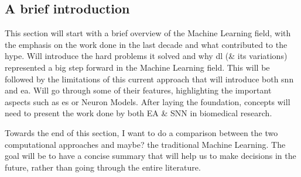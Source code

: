 \subsection{A brief introduction}

This section will start with a brief overview of the Machine Learning field, with the emphasis on the work done in the last decade and what contributed to the hype. Will introduce the hard problems it solved and why \acrshort{dl} (\& its variations) represented a big step forward in the Machine Learning field. This will be followed by the limitations of this current approach that will introduce both \acrfull{snn} and \acrfull{ea}. Will go through some of their features, highlighting the important aspects such as \acrfull{es} or Neuron Models. After laying the foundation, concepts will need to present the work done by both EA \& SNN in biomedical research. 

Towards the end of this section, I want to do a comparison between the two computational approaches and maybe? the traditional Machine Learning. The goal will be to have a concise summary that will help us to make decisions in the future, rather than going through the entire literature. 

